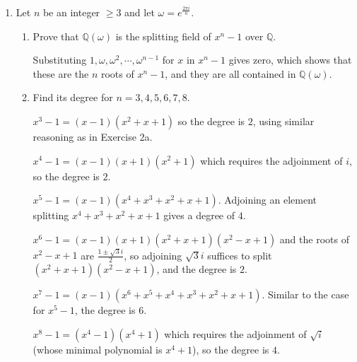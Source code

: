 \documentclass[12pt]{article}
\newcommand{\QQ}{\mathbb{Q}}
\begin{document}
\begin{enumerate}
    \item Let $n$ be an integer $\geq 3$ and let $\omega = e^\frac{2\pi i}{n}$.
    \begin{enumerate}
        \item Prove that $\QQ(\omega)$ is the splitting field of $x^n - 1$ over $\QQ$. \par
            Substituting $1, \omega, \omega^2, \cdots, \omega^{n - 1}$ for $x$ in $x^n - 1$ gives zero, which shows that these are the $n$ roots of $x^n - 1$, and they are all contained in $\QQ(\omega)$.
        \item Find its degree for $n=3,4,5,6,7,8$. \par
            $x^3 - 1 = (x - 1)(x^2 + x + 1)$ so the degree is $2$, using similar reasoning as in Exercise 2a. \par
            $x^4 - 1 = (x - 1)(x + 1)(x^2 + 1)$ which requires the adjoinment of $i$, so the degree is $2$. \par
            $x^5 - 1 = (x - 1)(x^4 + x^3 + x^2 + x + 1)$. Adjoining an element splitting $x^4 + x^3 + x^2 + x + 1$ gives a degree of $4$. \par
            $x^6 - 1 = (x - 1)(x + 1)(x^2 + x + 1)(x^2 - x + 1)$ and the roots of $x^2 - x + 1$ are $\frac{1 \pm \sqrt{3}i}{2}$, so adjoining $\sqrt{3}i$ suffices to split $(x^2 + x + 1)(x^2 - x + 1)$, and the degree is $2$. \par
            $x^7 - 1 = (x - 1)(x^6 + x^5 + x^4 + x^3 + x^2 + x + 1)$. Similar to the case for $x^5 - 1$, the degree is $6$. \par
            $x^8 - 1 = (x^4 - 1)(x^4 + 1)$ which requires the adjoinment of $\sqrt{i}$ (whose minimal polynomial is $x^4 + 1$), so the degree is $4$.
    \end{enumerate}



\end{enumerate}
\end{document}
